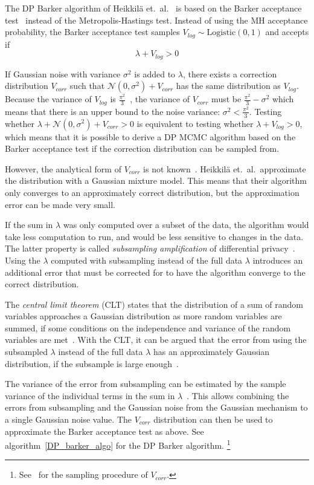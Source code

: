 \documentclass[english,twoside,openright]{HYgraduMLDS}
\newcommand{\caln}{{\mathcal{N}}}
\begin{document}
The DP Barker algorithm of Heikkilä et.\ al.~\cite{HeikkilaJDH19} is based on 
the Barker acceptance test~\cite{Barker65} instead of the Metropolis-Hastings test.
Instead of using the MH acceptance probability, the Barker acceptance test samples 
\(V_{log}\sim \mathrm{Logistic(0, 1)}\) and accepts if 
\[
    \lambda + V_{log} > 0
\]

If Gaussian noise with variance \(\sigma^2\) is added to 
\(\lambda\), there exists a correction 
distribution \(V_{corr}\) such that \(\caln(0, \sigma^2) + V_{corr}\) has the 
same distribution as \(V_{log}\). Because the variance of \(V_{log}\) is 
\(\frac{\pi^2}{3}\)~\cite{HeikkilaJDH19}, the variance of \(V_{corr}\) must be 
\(\frac{\pi^2}{3} - \sigma^2\) which means that there is an upper bound
to the noise variance: \(\sigma^2 < \frac{\pi^2}{3}\). Testing whether 
\(\lambda + \caln(0, \sigma^2) + V_{corr} > 0\) is equivalent to testing 
whether \(\lambda + V_{log} > 0\), which means that it is possible to derive 
a DP MCMC algorithm based on the Barker acceptance test if the correction 
distribution can be sampled from.

However, the analytical form of \(V_{corr}\) is not known~\cite{HeikkilaJDH19}.
Heikkilä et.\ al.\  approximate the distribution with a Gaussian mixture model. 
This means that their 
algorithm only converges to an approximately correct distribution, but the 
approximation error can be made very small.

If the sum in \(\lambda\) was only computed over a subset of the data, the 
algorithm would take less computation to run, and would be less sensitive 
to changes in the data. The latter property is called \emph{subsampling amplification}
of differential privacy~\cite{WangBK19}. Using the \(\lambda\) computed 
with subsampling instead of the full data \(\lambda\) introduces an additional 
error that must be corrected for to have the algorithm converge to the correct 
distribution. 

The \emph{central limit theorem} (CLT) states that the distribution of a sum 
of random variables approaches a Gaussian distribution as more random variables 
are summed, if some conditions on the independence and variance of the random 
variables are met~\cite{HeikkilaJDH19}. With the CLT, it can be argued 
that the error from 
using the subsampled \(\lambda\) instead of the full data \(\lambda\) has an 
approximately Gaussian distribution, if the subsample is large 
enough~\cite{HeikkilaJDH19}. 

The variance of the error from subsampling can 
be estimated by the sample variance of the individual terms in the sum in 
\(\lambda\)~\cite{HeikkilaJDH19}. This allows combining the errors from subsampling and the 
Gaussian noise from the Gaussian mechanism to a single Gaussian noise value.
The \(V_{corr}\) distribution can then be used to approximate the Barker acceptance 
test as above. See algorithm~\ref{DP_barker_algo} for the DP Barker algorithm.
\footnote{
    See~\cite{HeikkilaJDH19} for the sampling procedure of \(V_{corr}\).
}
\end{document}
